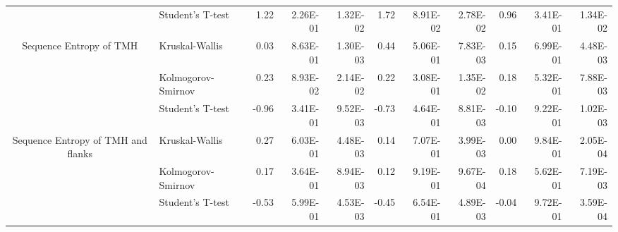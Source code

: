 \begin{table}[htbp]
\begin{tabular}{clrrrrrrrrr}
          &  Student's T-test & 1.22  & 2.26E-01 & 1.32E-02 & 1.72  & 8.91E-02 & 2.78E-02 & 0.96  & 3.41E-01 & 1.34E-02 \\
    \multirow{3}[0]{*}{Sequence Entropy of TMH } &  Kruskal-Wallis & 0.03  & 8.63E-01 & 1.30E-03 & 0.44  & 5.06E-01 & 7.83E-03 & 0.15  & 6.99E-01 & 4.48E-03 \\
          &  Kolmogorov-Smirnov & 0.23  & 8.93E-02 & 2.14E-02 & 0.22  & 3.08E-01 & 1.35E-02 & 0.18  & 5.32E-01 & 7.88E-03 \\
          &  Student's T-test & -0.96 & 3.41E-01 & 9.52E-03 & -0.73 & 4.64E-01 & 8.81E-03 & -0.10 & 9.22E-01 & 1.02E-03 \\
    \multirow{3}[0]{*}{Sequence Entropy of TMH and flanks } &  Kruskal-Wallis & 0.27  & 6.03E-01 & 4.48E-03 & 0.14  & 7.07E-01 & 3.99E-03 & 0.00  & 9.84E-01 & 2.05E-04 \\
          &  Kolmogorov-Smirnov & 0.17  & 3.64E-01 & 8.94E-03 & 0.12  & 9.19E-01 & 9.67E-04 & 0.18  & 5.62E-01 & 7.19E-03 \\
          &  Student's T-test & -0.53 & 5.99E-01 & 4.53E-03 & -0.45 & 6.54E-01 & 4.89E-03 & -0.04 & 9.72E-01 & 3.59E-04 \\
    \end{tabular}%
  \label{tab:addlabel}%
\end{table}%




